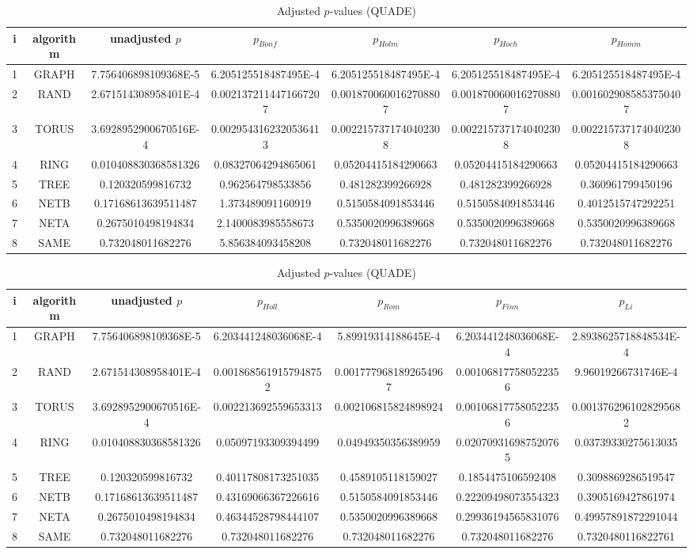 \documentclass[a4paper,10pt]{article}
\begin{document}
\begin{landscape}
\begin{table}[!htp]
\centering\scriptsize
\caption{Adjusted $p$-values (QUADE)}
\begin{tabular}{ccccccc}
i&algorithm&unadjusted $p$&$p_{Bonf}$&$p_{Holm}$&$p_{Hoch}$&$p_{Homm}$\\
\hline
1& GRAPH&7.756406898109368E-5&6.205125518487495E-4&6.205125518487495E-4&6.205125518487495E-4&6.205125518487495E-4\\
2& RAND&2.671514308958401E-4&0.0021372114471667207&0.0018700600162708807&0.0018700600162708807&0.0016029085853750407\\
3& TORUS&3.6928952900670516E-4&0.0029543162320536413&0.0022157371740402308&0.0022157371740402308&0.0022157371740402308\\
4& RING&0.010408830368581326&0.08327064294865061&0.05204415184290663&0.05204415184290663&0.05204415184290663\\
5& TREE&0.120320599816732&0.962564798533856&0.481282399266928&0.481282399266928&0.360961799450196\\
6& NETB&0.17168613639511487&1.373489091160919&0.5150584091853446&0.5150584091853446&0.4012515747292251\\
7& NETA&0.2675010498194834&2.1400083985558673&0.5350020996389668&0.5350020996389668&0.5350020996389668\\
8& SAME&0.732048011682276&5.856384093458208&0.732048011682276&0.732048011682276&0.732048011682276\\
\hline
\end{tabular}
\end{table}

\begin{table}[!htp]
\centering\scriptsize
\caption{Adjusted $p$-values (QUADE)}
\begin{tabular}{ccccccc}
i&algorithm&unadjusted $p$&$p_{Holl}$&$p_{Rom}$&$p_{Finn}$&$p_{Li}$\\
\hline
1& GRAPH&7.756406898109368E-5&6.203441248036068E-4&5.89919314188645E-4&6.203441248036068E-4&2.8938625718848534E-4\\
2& RAND&2.671514308958401E-4&0.0018685619157948752&0.0017779681892654967&0.001068177580522356&9.96019266731746E-4\\
3& TORUS&3.6928952900670516E-4&0.002213692559653313&0.002106815824898924&0.001068177580522356&0.0013762961028295682\\
4& RING&0.010408830368581326&0.05097193309394499&0.04949350356389959&0.020709316987520765&0.03739330275613035\\
5& TREE&0.120320599816732&0.40117808173251035&0.4589105118159027&0.1854475106592408&0.3098869286519547\\
6& NETB&0.17168613639511487&0.43169066367226616&0.5150584091853446&0.22209498073554323&0.3905169427861974\\
7& NETA&0.2675010498194834&0.46344528798444107&0.5350020996389668&0.29936194565831076&0.49957891872291044\\
8& SAME&0.732048011682276&0.732048011682276&0.732048011682276&0.732048011682276&0.7320480116822761\\
\hline
\end{tabular}
\end{table}

\end{landscape}
\end{document}
